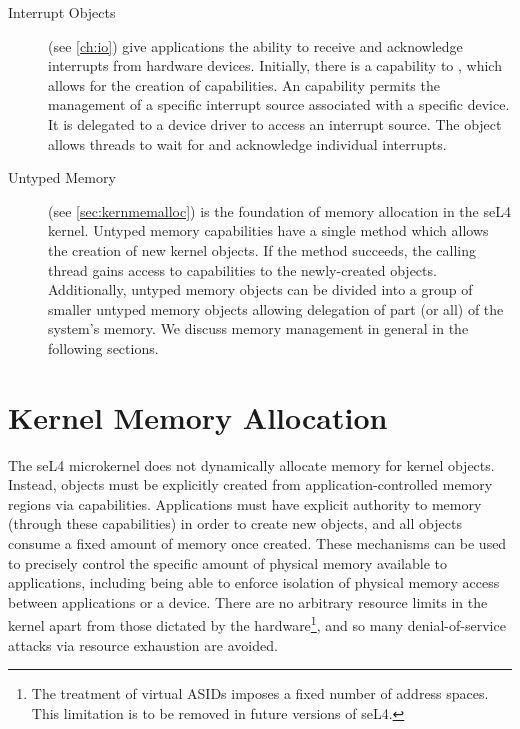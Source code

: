 \begin{description}
    \item[Interrupt Objects] (see \autoref{ch:io}) give applications the ability to receive
    and acknowledge interrupts from hardware devices.
    Initially, there is a capability to ,
    which allows for the creation of  capabilities.
    An  capability permits the management of a specific 
    interrupt source associated with a specific device.
    It is delegated to
    a device driver to access an interrupt source. The 
    object allows threads to wait for and acknowledge individual
    interrupts.

    \item[Untyped Memory] (see \autoref{sec:kernmemalloc}) is the foundation of memory allocation
    in the seL4 kernel.  Untyped memory capabilities have a single method
    which allows the creation of new kernel objects. If the method
    succeeds, the calling thread gains access to capabilities to the
    newly-created objects. Additionally, untyped memory objects can be
    divided into a group of smaller untyped memory objects allowing
    delegation of part (or all) of the system's memory.  We discuss
    memory management in general in the following sections.

\end{description}

\section{Kernel Memory Allocation}
\label{sec:kernmemalloc}

The seL4 microkernel does not dynamically allocate memory for kernel objects.
Instead, objects must be explicitly created from application-controlled memory
regions via  capabilities.  Applications must have
explicit authority to memory (through these  capabilities) in
order to create new objects, and all objects consume a fixed amount of memory once
created. These mechanisms can be used to precisely control
the specific amount of physical memory available to applications,
including being able to enforce isolation of physical memory access
between applications or a device.  There are no arbitrary resource
limits in the kernel apart from those dictated by the
hardware\footnote{The treatment of virtual ASIDs imposes a fixed number
of address spaces. This limitation is to be removed in future
versions of seL4.}, and so many denial-of-service attacks via resource
exhaustion are avoided.

